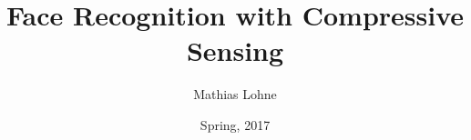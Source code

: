 \documentclass[a4paper, article, oneside, USenglish, hidelinks]{memoir}
\title{Face Recognition with Compressive Sensing}
\author{Mathias Lohne}
\date{Spring, 2017}
\makeatletter
\let\origchapter\chapter
\renewcommand\chapter{\@ifstar{\starchapter}{\nostarchapter}}
\newcommand\nostarchapter[1]
{\chapterprelude\origchapter{#1}\chapterpostlude}
\newcommand\starchapter[1]
{\chapterprelude\origchapter*{#1}\chapterpostlude}
\newcommand\chapterprelude{%
	\vspace{2.5em}
}
\newcommand\chapterpostlude{%
}
\let\origsection\section
\renewcommand\section{\@ifstar{\starsection}{\nostarsection}}
\newcommand\nostarsection[1]
{\sectionprelude\origsection{#1}\sectionpostlude}
\newcommand\starsection[1]
{\sectionprelude\origsection*{#1}\sectionpostlude}
\newcommand\sectionprelude{%
	\vspace{1.5em}
}
\newcommand\sectionpostlude{%
}
\newcommand{\pythonimport}[1]{
	
}
\newcommand{\0}{\mathbf{0}}
\newcommand{\1}{\mathbf{1}}
\makeatother
\begin{document}
\maketitle

\begin{abstract}
	\noindent
\end{abstract}

\begin{KeepFromToc}
\end{KeepFromToc}









\printbibliography

\end{document}
